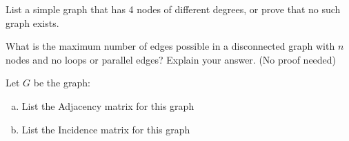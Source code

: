 \documentclass[10pt,letterpaper, cm]{hmcpset}
\begin{document}
\begin{problem}[3]
  List a simple graph that has 4 nodes of different degrees, or prove that no such graph exists.
\end{problem}

\begin{problem}[4]
What is the maximum number of edges possible in a disconnected graph with $n$ nodes and no loops or parallel edges?  Explain your answer. (No proof needed)
\end{problem}

\begin{problem}[5]
Let $G$ be the graph:


\begin{center}

\end{center}

\begin{enumerate}[(a)]
    \item List the Adjacency matrix for this graph
    \item List the Incidence matrix for this graph
\end{enumerate}
\end{problem}
\end{document}
